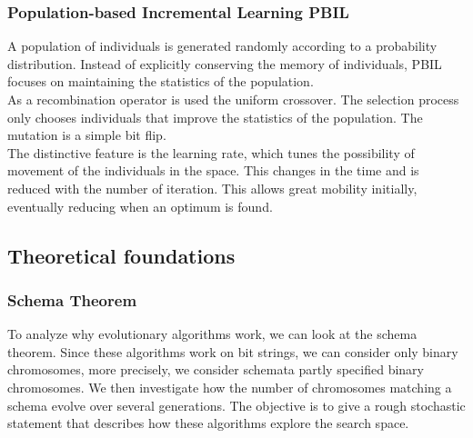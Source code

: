 \subsubsection{Population-based Incremental Learning PBIL}

A population of individuals is generated randomly according to a probability distribution. Instead of explicitly conserving the memory of individuals, PBIL focuses on maintaining the statistics of the population.\\

As a recombination operator is used the uniform crossover. The selection process only chooses individuals that improve the statistics of the population. The mutation is a simple bit flip.\\

The distinctive feature is the learning rate, which tunes the possibility of movement of the individuals in the space. This changes in the time and is reduced with the number of iteration. This allows great mobility initially, eventually reducing when an optimum is found. \\

\subsection{Theoretical foundations}

\subsubsection{Schema Theorem}
To analyze why evolutionary algorithms work, we can look at the schema theorem. Since these algorithms work on bit strings, we can consider only binary chromosomes, more precisely, we consider schemata partly specified binary chromosomes. We then investigate how the number of chromosomes matching a schema evolve over several generations. The objective is to give a rough stochastic statement that describes how these algorithms explore the search space.\\

